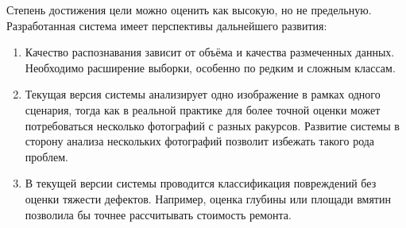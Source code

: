Степень достижения цели можно оценить как высокую, но не предельную. Разработанная система имеет перспективы дальнейшего развития:

\begin{enumerate}[label=\arabic*.]
  \item Качество распознавания зависит от объёма и качества размеченных данных. Необходимо расширение выборки, особенно по редким и сложным классам.
  \item Текущая версия системы анализирует одно изображение в рамках одного сценария, тогда как в реальной практике для более точной оценки может потребоваться несколько фотографий с разных ракурсов. Развитие системы в сторону анализа нескольких фотографий позволит избежать такого рода проблем.
  \item В текущей версии системы проводится классификация повреждений без оценки тяжести дефектов. Например, оценка глубины или площади вмятин позволила бы точнее рассчитывать стоимость ремонта.
\end{enumerate}

